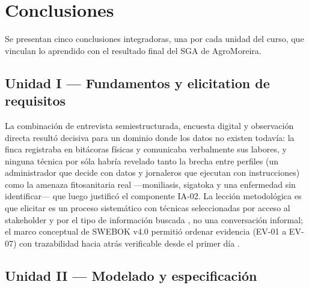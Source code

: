 \section{Conclusiones}
\label{sec:conclusiones}

Se presentan cinco conclusiones integradoras, una por cada unidad del curso, que vinculan lo aprendido con el resultado final del SGA de AgroMoreira.

\subsection*{Unidad I --- Fundamentos y elicitation de requisitos}

La combinaci\'on de entrevista semiestructurada, encuesta digital y observaci\'on directa result\'o decisiva para un dominio donde los datos no existen todav\'ia: la finca registraba en bit\'acoras f\'isicas y comunicaba verbalmente sus labores, y ninguna t\'ecnica por s\'ola habr\'ia revelado tanto la brecha entre perfiles (un administrador que decide con datos y jornaleros que ejecutan con instrucciones) como la amenaza fitosanitaria real ---moniliasis, sigatoka y una enfermedad sin identificar--- que luego justific\'o el componente IA-02. La lecci\'on metodol\'ogica es que elicitar es un proceso sistem\'atico con t\'ecnicas seleccionadas por acceso al stakeholder y por el tipo de informaci\'on buscada \cite{pohl2025}, no una conversaci\'on informal; el marco conceptual de SWEBOK v4.0 permiti\'o ordenar evidencia (EV-01 a EV-07) con trazabilidad hacia atr\'as verificable desde el primer d\'ia \cite{swebok2024}.

\subsection*{Unidad II --- Modelado y especificaci\'on}


